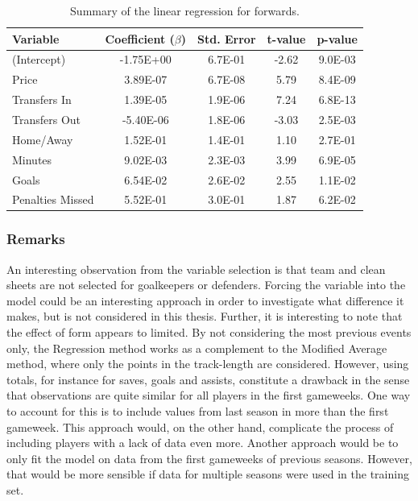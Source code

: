 \begin{table}[H]
\centering
\begin{tabular}{|l|c|c|c|c|}
\hline
Variable         & Coefficient ($\beta$)  & Std. Error & t-value & p-value \\ \hline
(Intercept)      & -1.75E+00 & 6.7E-01    & -2.62   & 9.0E-03 \\
Price            & 3.89E-07  & 6.7E-08    & 5.79    & 8.4E-09 \\
Transfers In     & 1.39E-05  & 1.9E-06    & 7.24    & 6.8E-13 \\
Transfers Out    & -5.40E-06 & 1.8E-06    & -3.03   & 2.5E-03 \\
Home/Away        & 1.52E-01  & 1.4E-01    & 1.10    & 2.7E-01 \\
Minutes          & 9.02E-03  & 2.3E-03    & 3.99    & 6.9E-05 \\
Goals            & 6.54E-02  & 2.6E-02    & 2.55    & 1.1E-02 \\
Penalties Missed & 5.52E-01  & 3.0E-01    & 1.87    & 6.2E-02 \\
\hline
\end{tabular}
\caption{Summary of the linear regression for forwards.}
\label{tab:coef_FWD}
\end{table}

\subsubsection{Remarks}

An interesting observation from the variable selection is that team and clean sheets are not selected for goalkeepers or defenders. Forcing the variable into the model could be an interesting approach in order to investigate what difference it makes, but is not considered in this thesis. Further, it is interesting to note that the effect of form appears to limited. By not considering the most previous events only, the Regression method works as a complement to the Modified Average method, where only the points in the track-length are considered. However, using totals, for instance for saves, goals and assists, constitute a drawback in the sense that observations are quite similar for all players in the first gameweeks. One way to account for this is to include values from last season in more than the first gameweek. This approach would, on the other hand, complicate the process of including players with a lack of data even more. Another approach would be to only fit the model on data from the first gameweeks of previous seasons. However, that would be more sensible if data for multiple seasons were used in the training set.

